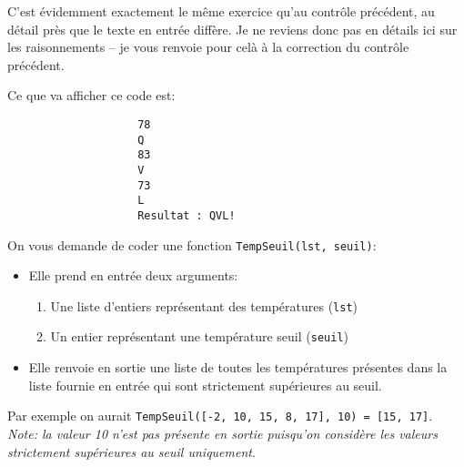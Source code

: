 \documentclass[11pt,a4paper]{exam}
\begin{document}
\begin{questions}
\begin{spacing}{1}
\begin{solution}
				C'est évidemment exactement le même exercice qu'au contrôle précédent, au détail près que le texte en entrée diffère. Je ne reviens donc pas en détails ici sur les raisonnements -- je vous renvoie pour celà à la correction du contrôle précédent.
				
				Ce que va afficher ce code est:
				\begin{verbatim}
					78
					Q
					83
					V
					73
					L
					Resultat : QVL!
				\end{verbatim}
			\end{solution} 
			
		
			On vous demande de coder une fonction \texttt{TempSeuil(lst, seuil)}:
			\begin{itemize}
				\item Elle prend en entrée deux arguments:
				\begin{enumerate}
					\item Une liste d'entiers représentant des températures (\texttt{lst})
					\item Un entier représentant une température seuil (\texttt{seuil})
				\end{enumerate}
				\item Elle renvoie en sortie une liste de toutes les températures présentes dans la liste fournie en entrée qui sont strictement supérieures au seuil.
			\end{itemize}
			Par exemple on aurait \texttt{TempSeuil([-2, 10, 15, 8, 17], 10) = [15, 17]}. \textit{Note: la valeur 10 n'est pas présente en sortie puisqu'on considère les valeurs strictement supérieures au seuil uniquement}.
			
			
			\begin{solution}
				

\end{solution}
\end{spacing}
\end{questions}
\end{document}
